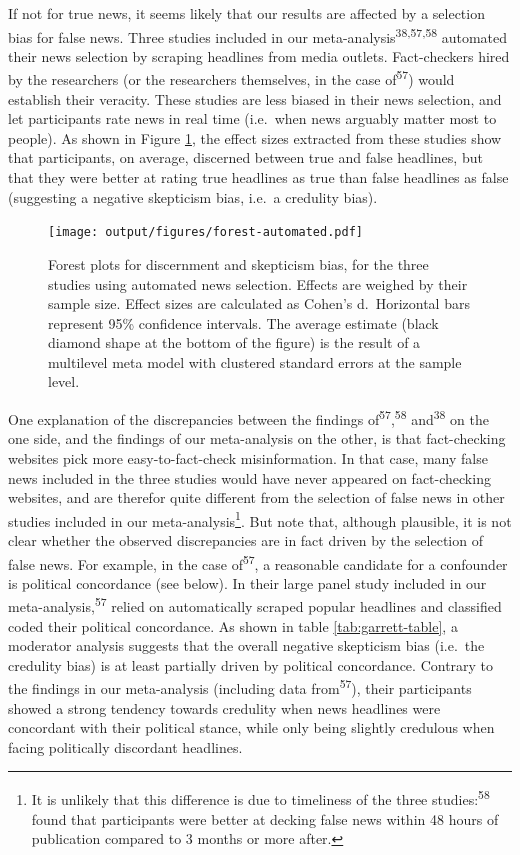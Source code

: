 \documentclass[
  doc,floatsintext]{apa6}
\begin{document}
If not for true news, it seems likely that our results are affected by a selection bias for false news. Three studies included in our meta-analysis\textsuperscript{38,57,58} automated their news selection by scraping headlines from media outlets. Fact-checkers hired by the researchers (or the researchers themselves, in the case of\textsuperscript{57}) would establish their veracity. These studies are less biased in their news selection, and let participants rate news in real time (i.e.~when news arguably matter most to people). As shown in Figure \ref{fig:forest-automated}, the effect sizes extracted from these studies show that participants, on average, discerned between true and false headlines, but that they were better at rating true headlines as true than false headlines as false (suggesting a negative skepticism bias, i.e.~a credulity bias).



\begin{figure}
\centering
\texttt{[image: output/figures/forest-automated.pdf]}
\caption{\label{fig:forest-automated}Forest plots for discernment and skepticism bias, for the three studies using automated news selection. Effects are weighed by their sample size. Effect sizes are calculated as Cohen's d.~Horizontal bars represent 95\% confidence intervals. The average estimate (black diamond shape at the bottom of the figure) is the result of a multilevel meta model with clustered standard errors at the sample level.}
\end{figure}

One explanation of the discrepancies between the findings of\textsuperscript{57},\textsuperscript{58} and\textsuperscript{38} on the one side, and the findings of our meta-analysis on the other, is that fact-checking websites pick more easy-to-fact-check misinformation. In that case, many false news included in the three studies would have never appeared on fact-checking websites, and are therefor quite different from the selection of false news in other studies included in our meta-analysis\footnote{It is unlikely that this difference is due to timeliness of the three studies:\textsuperscript{58} found that participants were better at decking false news within 48 hours of publication compared to 3 months or more after.}. But note that, although plausible, it is not clear whether the observed discrepancies are in fact driven by the selection of false news. For example, in the case of\textsuperscript{57}, a reasonable candidate for a confounder is political concordance (see below). In their large panel study included in our meta-analysis,\textsuperscript{57} relied on automatically scraped popular headlines and classified coded their political concordance. As shown in table \ref{tab:garrett-table}, a moderator analysis suggests that the overall negative skepticism bias (i.e.~the credulity bias) is at least partially driven by political concordance. Contrary to the findings in our meta-analysis (including data from\textsuperscript{57}), their participants showed a strong tendency towards credulity when news headlines were concordant with their political stance, while only being slightly credulous when facing politically discordant headlines.
\end{document}

